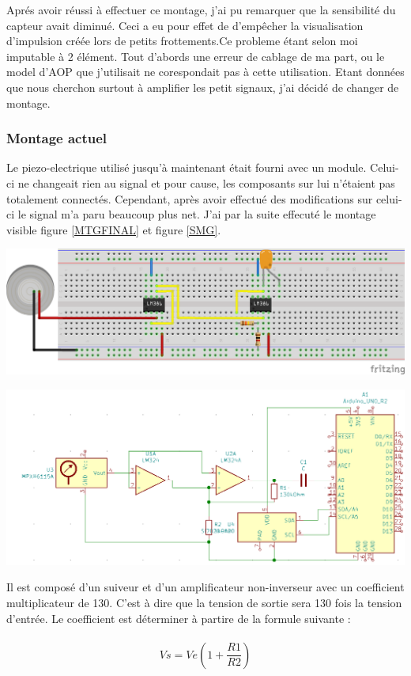 \documentclass[12pt,french,a4paper]{article}
\begin{document}
Aprés avoir réussi à effectuer ce montage, j’ai pu remarquer que la sensibilité du capteur avait diminué. Ceci a eu pour effet de d’empêcher la visualisation d’impulsion créée lors de petits frottements.Ce probleme étant selon moi imputable à 2 élément. Tout d'abords une erreur de cablage de ma part, ou le model d'AOP que j'utilisait ne corespondait pas à cette utilisation. Etant données que nous cherchon surtout à amplifier les petit signaux, j’ai décidé de changer de montage.

\subsubsection{Montage actuel}
Le piezo-electrique utilisé jusqu’à maintenant était fourni avec un module. Celui-ci ne changeait rien au signal et pour cause, les composants sur lui n’étaient pas totalement connectés. Cependant, après avoir effectué des modifications sur celui-ci le signal m'a paru beaucoup plus net.
J’ai par la suite effecuté le montage visible figure \ref{MTGFINAL} et figure \ref{SMG}.
\\
\begin{center}	
\includegraphics[scale=0.85]{../img/mtgfinal.png}
\label{MTGFINAL}
\end{center}

\begin{center}
    \includegraphics[scale=0.5]{../img/SMG.png}
    \label{SMG}
\end{center}
Il est composé d’un suiveur et d’un amplificateur non-inverseur avec un coefficient multiplicateur de 130. C'est à dire que la tension de sortie sera 130 fois la tension d'entrée. Le coefficient est déterminer à partire de la formule suivante : \\ \\
\[
	Vs = Ve (1 + \frac{R1}{R2})
\]
\end{document}
